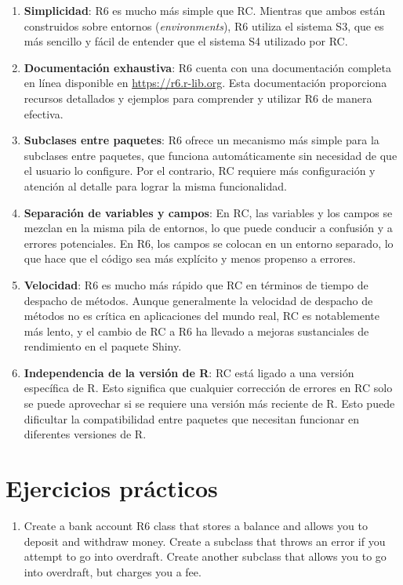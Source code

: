 \documentclass[
]{book}
\providecommand{\tightlist}{%
  \setlength{\itemsep}{0pt}\setlength{\parskip}{0pt}}
\begin{document}
\begin{enumerate}
\def\labelenumi{\arabic{enumi}.}
\item
  \textbf{Simplicidad}: R6 es mucho más simple que RC. Mientras que ambos están construidos sobre entornos (\emph{environments}), R6 utiliza el sistema S3, que es más sencillo y fácil de entender que el sistema S4 utilizado por RC.
\item
  \textbf{Documentación exhaustiva}: R6 cuenta con una documentación completa en línea disponible en \url{https://r6.r-lib.org}. Esta documentación proporciona recursos detallados y ejemplos para comprender y utilizar R6 de manera efectiva.
\item
  \textbf{Subclases entre paquetes}: R6 ofrece un mecanismo más simple para la subclases entre paquetes, que funciona automáticamente sin necesidad de que el usuario lo configure. Por el contrario, RC requiere más configuración y atención al detalle para lograr la misma funcionalidad.
\item
  \textbf{Separación de variables y campos}: En RC, las variables y los campos se mezclan en la misma pila de entornos, lo que puede conducir a confusión y a errores potenciales. En R6, los campos se colocan en un entorno separado, lo que hace que el código sea más explícito y menos propenso a errores.
\item
  \textbf{Velocidad}: R6 es mucho más rápido que RC en términos de tiempo de despacho de métodos. Aunque generalmente la velocidad de despacho de métodos no es crítica en aplicaciones del mundo real, RC es notablemente más lento, y el cambio de RC a R6 ha llevado a mejoras sustanciales de rendimiento en el paquete Shiny.
\item
  \textbf{Independencia de la versión de R}: RC está ligado a una versión específica de R. Esto significa que cualquier corrección de errores en RC solo se puede aprovechar si se requiere una versión más reciente de R. Esto puede dificultar la compatibilidad entre paquetes que necesitan funcionar en diferentes versiones de R.
\end{enumerate}

\hypertarget{ejercicios-pruxe1cticos}{%
\section{Ejercicios prácticos}\label{ejercicios-pruxe1cticos}}

\begin{enumerate}
\def\labelenumi{\arabic{enumi}.}
\tightlist
\item
  Create a bank account R6 class that stores a balance and allows you to deposit and withdraw money. Create a subclass that throws an error if you attempt to go into overdraft. Create another subclass that allows you to go into overdraft, but charges you a fee.
\end{enumerate}
\end{document}
